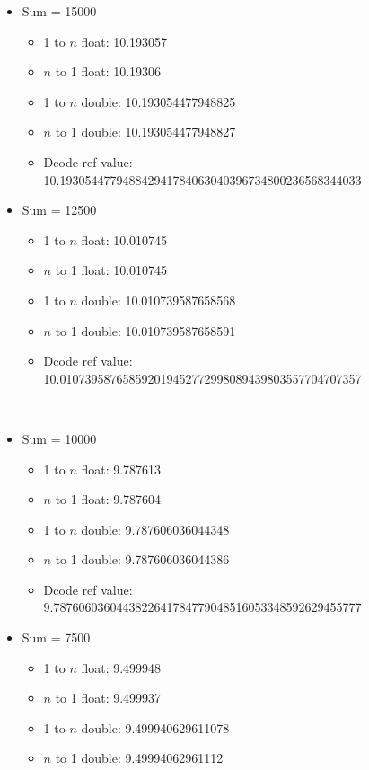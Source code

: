 \documentclass[12pt]{article}
\begin{document}
\begin{itemize}
\item Sum = 15000
\begin{itemize}

\item 1 to $n$ float: 10.193057
\item $n$ to 1 float: 10.19306
\\
\item 1 to $n$ double: 10.193054477948825
\item $n$ to 1 double: 10.193054477948827
\\
\item Dcode ref value: 10.193054477948842941784063040396734800236568344033
\\
\end{itemize}
\item Sum = 12500
\begin{itemize}
\item 1 to $n$ float: 10.010745
\item $n$ to 1 float: 10.010745
\\
\item 1 to $n$ double: 10.010739587658568
\item $n$ to 1 double: 10.010739587658591
\\
\item Dcode ref value: 10.010739587658592019452772998089439803557704707357
\end{itemize}
\\
\item Sum = 10000
\begin{itemize}
\item 1 to $n$ float: 9.787613
\item $n$ to 1 float: 9.787604
\\
\item 1 to $n$ double: 9.787606036044348
\item $n$ to 1 double: 9.787606036044386
\\
\item Dcode ref value: 9.7876060360443822641784779048516053348592629455777
\end{itemize}
\break
\item Sum = 7500
\begin{itemize}
\item 1 to $n$ float: 9.499948
\item $n$ to 1 float: 9.499937
\\
\item 1 to $n$ double: 9.499940629611078
\item $n$ to 1 double: 9.49994062961112

\end{itemize}
\end{itemize}
\end{document}
